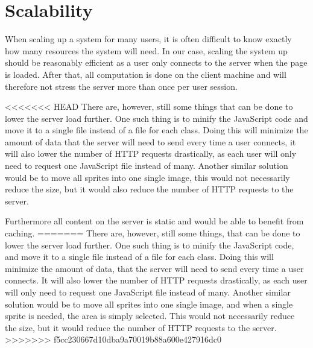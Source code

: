\section{Scalability}
When scaling up a system for many users, it is often difficult to know exactly how many resources the system will need.
In our case, scaling the system up should be reasonably efficient as a user only connects to the server when the page is loaded.
After that, all computation is done on the client machine and will therefore not stress the server more than once per user session.\newline

<<<<<<< HEAD
There are, however, still some things that can be done to lower the server load further. One such thing is to minify the JavaScript code and move it to a single file instead of a file for each class. Doing this will minimize the amount of data that the server will need to send every time a user connects, it will also lower the number of HTTP requests drastically, as each user will only need to request one JavaScript file instead of many. Another similar solution would be to move all sprites into one single image, this would not necessarily reduce the size, but it would also reduce the number of HTTP requests to the server.\newline

Furthermore all content on the server is static and would be able to benefit from caching. 
=======
There are, however, still some things, that can be done to lower the server load further.
One such thing is to minify the JavaScript code, and move it to a single file instead of a file for each class.
Doing this will minimize the amount of data, that the server will need to send every time a user connects.
It will also lower the number of HTTP requests drastically, as each user will only need to request one JavaScript file instead of many.
Another similar solution would be to move all sprites into one single image, and when a single sprite is needed, the area is simply selected. This would not necessarily reduce the size, but it would reduce the number of HTTP requests to the server.
>>>>>>> f5cc230667d10dba9a70019b88a600e427916dc0
